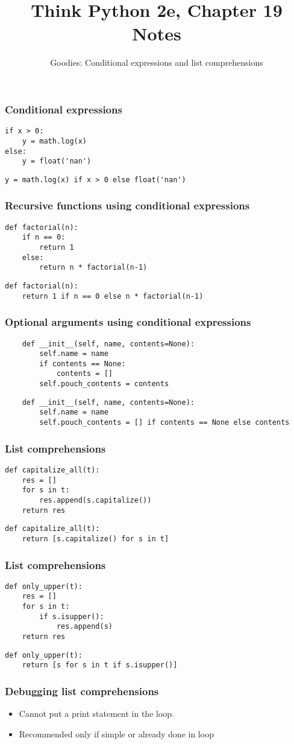 \documentclass{beamer}
\title{Think Python 2e, Chapter 19 Notes}
\author{Goodies: Conditional expressions and list comprehensions}
\newcommand{\bi}{\begin{itemize}}
\newcommand{\li}{\item}
\newcommand{\ei}{\end{itemize}}
\newcommand{\bfr}[1]{\begin{frame}[fragile]\frametitle{{ #1 }}}
\begin{document}
\begin{frame}
\maketitle
\end{frame}

\bfr{Conditional expressions}
\begin{lstlisting}
if x > 0:
    y = math.log(x)
else:
    y = float('nan')
\end{lstlisting}
\begin{lstlisting}
y = math.log(x) if x > 0 else float('nan')
\end{lstlisting}
\end{frame}

\bfr{Recursive functions using conditional expressions}
\begin{lstlisting}
def factorial(n):
    if n == 0:
        return 1
    else:
        return n * factorial(n-1)
\end{lstlisting}
\begin{lstlisting}
def factorial(n):
    return 1 if n == 0 else n * factorial(n-1)
\end{lstlisting}
\end{frame}

\bfr{Optional arguments using conditional expressions}
\begin{lstlisting}
    def __init__(self, name, contents=None):
        self.name = name
        if contents == None:
            contents = []
        self.pouch_contents = contents
\end{lstlisting}
\begin{lstlisting}
    def __init__(self, name, contents=None):
        self.name = name
        self.pouch_contents = [] if contents == None else contents 
\end{lstlisting}
\end{frame}

\bfr{List comprehensions}
\begin{lstlisting}
def capitalize_all(t):
    res = []
    for s in t:
        res.append(s.capitalize())
    return res
\end{lstlisting}
\begin{lstlisting}
def capitalize_all(t):
    return [s.capitalize() for s in t]
\end{lstlisting}
\end{frame}

\bfr{List comprehensions}
\begin{lstlisting}
def only_upper(t):
    res = []
    for s in t:
        if s.isupper():
            res.append(s)
    return res
\end{lstlisting}
\begin{lstlisting}
def only_upper(t):
    return [s for s in t if s.isupper()]
\end{lstlisting}
\end{frame}

\bfr{Debugging list comprehensions}
\bi
\li Cannot put a print statement in the loop.
\li Recommended only if simple or already done in loop
\ei
\end{frame}
\end{document}
